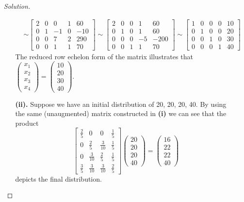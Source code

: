 \documentclass[ 12pt ]{article}
\begin{document}
\begin{enumerate}
\begin{proof}[Solution]
\begin{enumerate}
\begin{align*}
					&\sim \begin{bmatrix} 2 & 0 & 0 & 1 & 60 \\ 0 & 1 & -1 & 0 & -10 \\ 0 & 0 & 7 & 2 & 290 \\ 0 & 0 & 1 & 1 & 70 \end{bmatrix}
					\sim \begin{bmatrix} 2 & 0 & 0 & 1 & 60 \\ 0 & 1 & 0 & 1 & 60 \\ 0 & 0 & 0 & -5 & -200 \\ 0 & 0 & 1 & 1 & 70 \end{bmatrix}
					\sim \begin{bmatrix} 1 & 0 & 0 & 0 & 10 \\ 0 & 1 & 0 & 0 & 20 \\ 0 & 0 & 1 & 0 & 30 \\ 0 & 0 & 0 & 1 & 40 \end{bmatrix}
				\end{align*}
				The reduced row echelon form of the matrix illustrates that $\left (\begin{smallmatrix} x_1 \\ x_2 \\ x_3 \\ x_4 \end{smallmatrix}\right) = 
				\left (\begin{smallmatrix} 10 \\ 20 \\ 30 \\ 40 \end{smallmatrix}\right)$.
				\newpage
			\item[\textbf{(ii).}] Suppose we have an initial distribution of 20, 20, 20, 40. By using the same (unaugmented) matrix constructed in \textbf{(i)} we can see
				that the product $$\begin{bmatrix} \frac{2}{5} & 0 & 0 & \frac{1}{5} \\ 0 & \frac{2}{5} & \frac{3}{10} & \frac{1}{5} \\ 0 & \frac{3}{10} & \frac{2}{5} & \frac{1}{5} \\ \frac{3}{5} & \frac{3}{10} & \frac{3}{10} & \frac{2}{5} \end{bmatrix}
				\begin{pmatrix} 20 \\ 20 \\ 20 \\ 40 \end{pmatrix} = \begin{pmatrix} 16 \\ 22 \\ 22 \\ 40 \end{pmatrix}$$ depicts the final distribution.
		\end{enumerate}
	\end{proof}



\end{enumerate}
\end{document}
